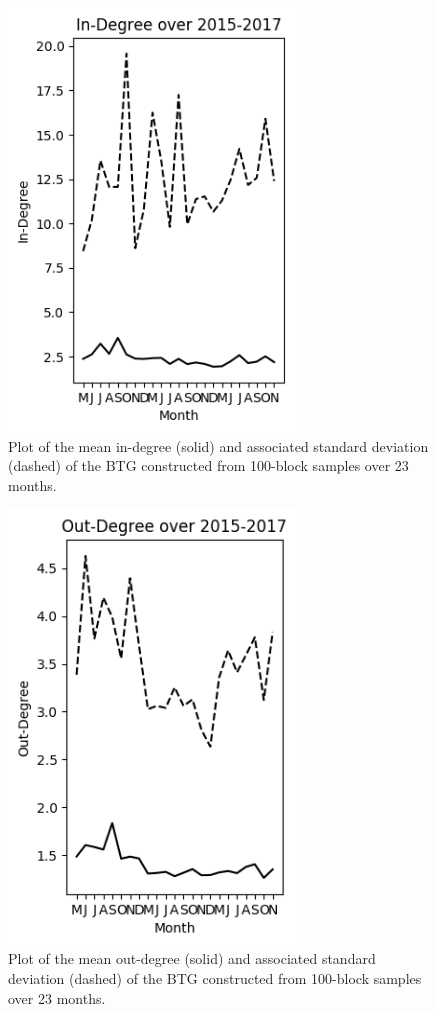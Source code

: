 \documentclass[letterpaper, 10 pt, conference]{ieeeconf}  %
\begin{document}
\begin{figure}
\centering
\includegraphics[width=3in]{Plots/Time/in_degree.png}
\caption{\label{in-degree} Plot of the mean in-degree (solid) and associated standard deviation (dashed) of the BTG constructed from 100-block samples over 23 months.}
\end{figure}

\begin{figure}
\centering
\includegraphics[width=3in]{Plots/Time/out_degree.png}
\caption{\label{out-degree} Plot of the mean out-degree (solid) and associated standard deviation (dashed) of the BTG constructed from 100-block samples over 23 months.}
\end{figure}
\end{document}
